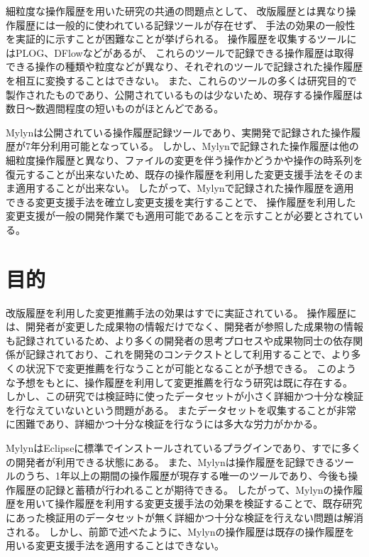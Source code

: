 \documentclass[a4paper]{jsbook}
\begin{document}
細粒度な操作履歴を用いた研究の共通の問題点として、
改版履歴とは異なり操作履歴には一般的に使われている記録ツールが存在せず、
手法の効果の一般性を実証的に示すことが困難なことが挙げられる。
操作履歴を収集するツールにはPLOG\cite{plog}、{\sc DFlow}\cite{minelli:2014}などがあるが、
これらのツールで記録できる操作履歴は取得できる操作の種類や粒度などが異なり、それぞれのツールで記録された操作履歴を相互に変換することはできない。
また、これらのツールの多くは研究目的で製作されたものであり、公開されているものは少ないため、現存する操作履歴は数日〜数週間程度の短いものがほとんどである。

Mylyn\cite{Kersten:2005}は公開されている操作履歴記録ツールであり、実開発で記録された操作履歴が7年分利用可能となっている。
しかし、Mylynで記録された操作履歴は他の細粒度操作履歴と異なり、ファイルの変更を伴う操作かどうかや操作の時系列を復元することが出来ないため、既存の操作履歴を利用した変更支援手法をそのまま適用することが出来ない。
したがって、Mylynで記録された操作履歴を適用できる変更支援手法を確立し変更支援を実行することで、
操作履歴を利用した変更支援が一般の開発作業でも適用可能であることを示すことが必要とされている。
\section{目的}
改版履歴を利用した変更推薦手法の効果はすでに実証されている\cite{Zimmermann:2005}。
操作履歴には、開発者が変更した成果物の情報だけでなく、開発者が参照した成果物の情報も記録されているため、より多くの開発者の思考プロセスや成果物同士の依存関係が記録されており、これを開発のコンテクストとして利用することで、より多くの状況下で変更推薦を行なうことが可能となることが予想できる。
このような予想をもとに、操作履歴を利用して変更推薦を行なう研究は既に存在する\cite{6233415,KatoJapanese:2011,ss2012-76,ss2013-84,Yamamori:2016}。
しかし、この研究では検証時に使ったデータセットが小さく詳細かつ十分な検証を行なえていないという問題がある。
またデータセットを収集することが非常に困難であり、詳細かつ十分な検証を行なうには多大な労力がかかる。

MylynはEclipseに標準でインストールされているプラグインであり、すでに多くの開発者が利用できる状態にある。
また、Mylynは操作履歴を記録できるツールのうち、1年以上の期間の操作履歴が現存する唯一のツールであり、今後も操作履歴の記録と蓄積が行われることが期待できる。
したがって、Mylynの操作履歴を用いて操作履歴を利用する変更支援手法の効果を検証することで、既存研究にあった検証用のデータセットが無く詳細かつ十分な検証を行えない問題は解消される。
しかし、前節で述べたように、Mylynの操作履歴は既存の操作履歴を用いる変更支援手法を適用することはできない。
\end{document}
